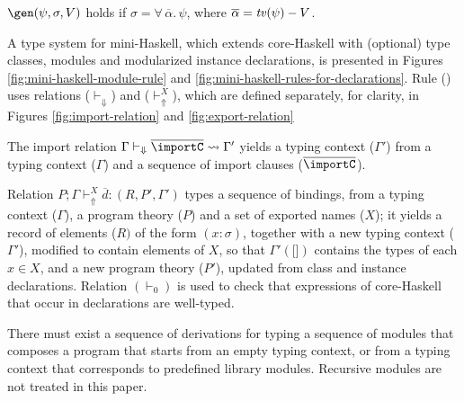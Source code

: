 $\gen(\psi,\sigma,V)$ holds if
  $\sigma=\forall\,\overline{\alpha}.\,\psi$, where
  $\overline{\alpha}=\text{\it tv\/}(\psi) - V$.

A type system for mini-Haskell, which extends core-Haskell with
(optional) type classes, modules and modularized instance
declarations, is presented in Figures
\ref{fig:mini-haskell-module-rule} and
\ref{fig:mini-haskell-rules-for-declarations}.
Rule (\MODULE) uses relations ($\vdash_{\Downarrow}$) and
($\vdash_{\Uparrow}^X$), which are defined separately, for clarity, in
Figures \ref{fig:import-relation} and \ref{fig:export-relation}

The import relation $\Gamma \vdash_{\Downarrow} \overline{\importC}
\leadsto \Gamma'$ yields a typing context ($\Gamma'$) from a typing
context ($\Gamma$) and a sequence of import clauses
($\overline{\importC}$).

Relation $P;\Gamma \vdash_{\Uparrow}^X \overline{\!d}:(R,P',\Gamma')$
types a sequence of bindings, from a typing context ($\Gamma$), a
program theory ($P$) and a set of exported names ($X$); it yields a
record of elements ($R)$ of the form $(x:\sigma)$, together with a new
typing context ($\Gamma'$), modified to contain elements of $X$, so
that $\Gamma'(\texttt{[]})$ contains the types of each $x\in X$, and a
new program theory ($P'$), updated from class and instance
declarations.  Relation $(\vdash_0)$ is used to check that expressions
of core-Haskell that occur in declarations are well-typed.


There must exist a sequence of derivations for typing a sequence of
modules that composes a program that starts from an empty typing
context, or from a typing context that corresponds to predefined
library modules. Recursive modules are not treated in this paper.

